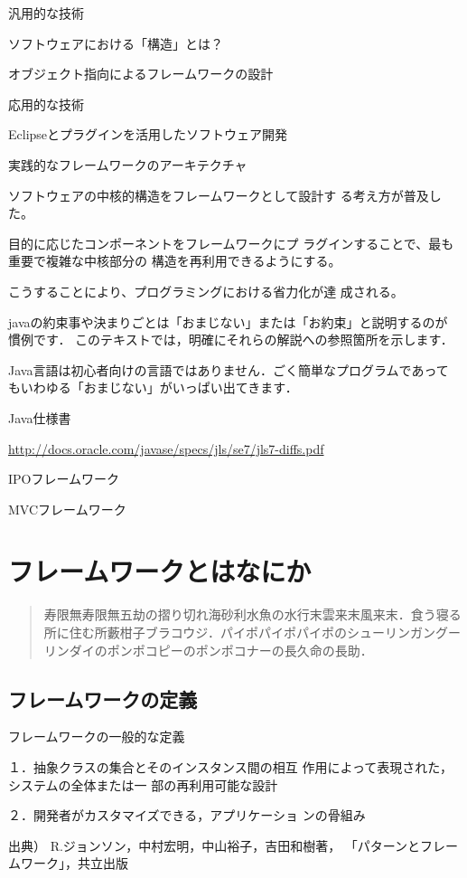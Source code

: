 \documentclass[a4j,papersize]{jsbook}
\begin{document}
汎用的な技術 

ソフトウェアにおける「構造」とは？ 

オブジェクト指向によるフレームワークの設計 

応用的な技術 

Eclipseとプラグインを活用したソフトウェア開発 

実践的なフレームワークのアーキテクチャ 

ソフトウェアの中核的構造をフレームワークとして設計す
る考え方が普及した。 

目的に応じたコンポーネントをフレームワークにプ
ラグインすることで、最も重要で複雑な中核部分の
構造を再利用できるようにする。 

こうすることにより、プログラミングにおける省力化が達
成される。


javaの約束事や決まりごとは「おまじない」または「お約束」と説明するのが
慣例です．
このテキストでは，明確にそれらの解説への参照箇所を示します．

Java言語は初心者向けの言語ではありません．ごく簡単なプログラムであって
もいわゆる「おまじない」がいっぱい出てきます．

Java仕様書

\url{http://docs.oracle.com/javase/specs/jls/se7/jls7-diffs.pdf}

IPOフレームワーク

MVCフレームワーク

\chapter{フレームワークとはなにか}

\begin{abstract}
寿限無寿限無五劫の摺り切れ海砂利水魚の水行末雲来末風来末．食う寝る所に住む所藪柑子ブラコウジ．パイポパイポパイポのシューリンガングーリンダイのポンポコピーのポンポコナーの長久命の長助．
\end{abstract}

\section{フレームワークの定義}
フレームワークの一般的な定義 

１．抽象クラスの集合とそのインスタンス間の相互
作用によって表現された，システムの全体または一
部の再利用可能な設計 

２．開発者がカスタマイズできる，アプリケーショ
ンの骨組み 

 出典） R.ジョンソン，中村宏明，中山裕子，吉田和樹著，
「パターンとフレームワーク」，共立出版 
\end{document}
